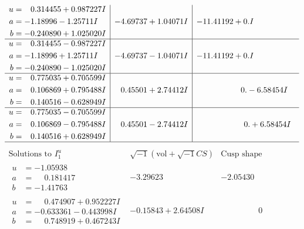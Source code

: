 \documentclass[1p]{elsarticle_modified}
\theoremstyle{definition}
\newcommand{\I}{\sqrt{-1}}
\begin{document}
$$\begin{array}{c|c|c}
\begin{aligned}
u &= \phantom{-}0.314455 + 0.987227 I \\
a &= -1.18996 - 1.25711 I \\
b &= -0.240890 + 1.025020 I\end{aligned}
 & -4.69737 + 1.04071 I & -11.41192 + 0. I\phantom{ +0.000000I} \\ \hline\begin{aligned}
u &= \phantom{-}0.314455 - 0.987227 I \\
a &= -1.18996 + 1.25711 I \\
b &= -0.240890 - 1.025020 I\end{aligned}
 & -4.69737 - 1.04071 I & -11.41192 + 0. I\phantom{ +0.000000I} \\ \hline\begin{aligned}
u &= \phantom{-}0.775035 + 0.705599 I \\
a &= \phantom{-}0.106869 + 0.795488 I \\
b &= \phantom{-}0.140516 - 0.628949 I\end{aligned}
 & \phantom{-}0.45501 + 2.74412 I & \phantom{-0.000000 } 0. - 6.58454 I \\ \hline\begin{aligned}
u &= \phantom{-}0.775035 - 0.705599 I \\
a &= \phantom{-}0.106869 - 0.795488 I \\
b &= \phantom{-}0.140516 + 0.628949 I\end{aligned}
 & \phantom{-}0.45501 - 2.74412 I & \phantom{-0.000000 -}0. + 6.58454 I\\
 \hline 
 \end{array}$$\newpage$$\begin{array}{c|c|c}  
\text{Solutions to }I^u_{1}& \I (\text{vol} + \sqrt{-1}CS) & \text{Cusp shape}\\
 \hline 
\begin{aligned}
u &= -1.05938\phantom{ +0.000000I} \\
a &= \phantom{-}0.181417\phantom{ +0.000000I} \\
b &= -1.41763\phantom{ +0.000000I}\end{aligned}
 & -3.29623\phantom{ +0.000000I} & -2.05430\phantom{ +0.000000I} \\ \hline\begin{aligned}
u &= \phantom{-}0.474907 + 0.952227 I \\
a &= -0.633361 - 0.443998 I \\
b &= \phantom{-}0.748919 + 0.467243 I\end{aligned}
 & -0.15843 + 2.64508 I & \phantom{-0.000000 } 0 \\ \hline\begin{aligned}

\end{aligned}
\end{array}$$
\end{document}

